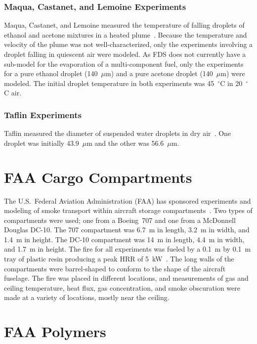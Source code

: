 \subsubsection{Maqua, Castanet, and Lemoine Experiments}
\label{Maqua_exp}

Maqua, Castanet, and Lemoine measured the temperature of falling droplets of ethanol and acetone mixtures in a heated plume~\cite{Maqua}. Because the temperature and velocity of the plume was not well-characterized, only the experiments involving a droplet falling in quiescent air were modeled. As FDS does not currently have a sub-model for the evaporation of a multi-component fuel, only the experiments for a pure ethanol droplet (140~$\mu$m) and a pure acetone droplet (140~$\mu$m) were modeled. The initial droplet temperature in both experiments was 45~$^\circ$C in 20~$^\circ$C air.

\subsubsection{Taflin Experiments}
\label{Taflin_exp}

Taflin measured the diameter of suspended water droplets in dry air~\cite{Snegirev:1}. One droplet was initially 43.9~$\mu$m and the other was 56.6~$\mu$m.

\section{FAA Cargo Compartments}
\label{FAA_Cargo_Description}

The U.S.~Federal Aviation Administration (FAA) has sponsored experiments and modeling of smoke transport within aircraft storage compartments~\cite{FAA-AR-03-49,FAA-AR-07-27}. Two types of compartments were used; one from a Boeing~707 and one from a McDonnell Douglas DC-10. The 707 compartment was 6.7~m in length, 3.2~m in width, and 1.4~m in height. The DC-10 compartment was 14~m in length, 4.4~m in width, and 1.7~m in height. The fire for all experiments was fueled by a 0.1~m by 0.1~m tray of plastic resin producing a peak HRR of 5~kW~\cite{FAA-AR-06-21}. The long walls of the compartments were barrel-shaped to conform to the shape of the aircraft fuselage. The fire was placed in different locations, and measurements of gas and ceiling temperature, heat flux, gas concentration, and smoke obscuration were made at a variety of locations, mostly near the ceiling.


\section{FAA Polymers}
\label{FAA_Polymers_Description}

